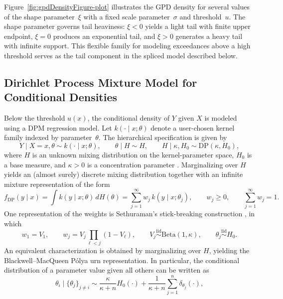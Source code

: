 \documentclass[article]{jss}\usepackage[]{graphicx}\usepackage[]{xcolor}
\begin{document}
Figure~\ref{fig:gpdDensityFigure-plot} illustrates the GPD density for
several values of the shape parameter~$\xi$ with a fixed scale
parameter~$\sigma$ and threshold~$u$.  The shape parameter governs
tail heaviness: $\xi < 0$ yields a light tail with finite upper
endpoint, $\xi = 0$ produces an exponential tail, and $\xi > 0$
generates a heavy tail with infinite support.  This flexible family for
modeling exceedances above a high threshold serves as the tail
component in the spliced model described below.


\subsection{Dirichlet Process Mixture Model for Conditional Densities}
\label{subsec:dpm}

Below the threshold $u(x)$, the conditional density of $Y$ given $X$
is modeled using a DPM regression model.  Let
$k(\cdot\mid x;\theta)$ denote a user-chosen kernel family indexed by
parameter~$\theta$.  The hierarchical specification is given by
\begin{equation}
Y \mid X=x,\theta \sim k(\cdot\mid x;\theta),
\qquad
\theta \mid H \sim H,
\qquad
H \mid \kappa,H_0 \sim \mathrm{DP}(\kappa,H_0),
\label{eq:dpm_hier}
\end{equation}
where $H$ is an unknown mixing distribution on the kernel-parameter
space, $H_0$ is a base measure, and $\kappa>0$ is a concentration
parameter \citep{Ferguson1973}.  Marginalizing over $H$ yields an
(almost surely) discrete mixing distribution together with an infinite
mixture representation of the form
\begin{equation}
f_{\mathrm{DP}}(y\mid x)
=
\int k(y\mid x;\theta)\,dH(\theta)
=
\sum_{j=1}^{\infty} w_j\,k(y\mid x;\theta_j),
\qquad
w_j\ge 0,
\qquad
\sum_{j=1}^{\infty} w_j=1.
\label{eq:dpm_mixture}
\end{equation}
One representation of the weights is Sethuraman's stick-breaking
construction \citep{Sethuraman1994}, in which
\begin{equation}
w_1=V_1,
\qquad
w_j=V_j\prod_{\ell<j}(1-V_\ell),
\qquad
V_j \stackrel{\mathrm{iid}}{\sim}\mathrm{Beta}(1,\kappa),
\qquad
\theta_j \stackrel{\mathrm{iid}}{\sim} H_0.
\label{eq:sb}
\end{equation}
An equivalent characterization is obtained by marginalizing over $H$,
yielding the Blackwell--MacQueen P\'olya urn representation.  In
particular, the conditional distribution of a parameter value given all
others can be written as
\begin{equation}
\theta_i \mid \{\theta_j\}_{j \neq i}
\sim
\frac{\kappa}{\kappa+n} H_0(\cdot)
+
\frac{1}{\kappa+n}\sum_{j=1}^{n}\delta_{\theta_j}(\cdot),
\label{eq:crp}
\end{equation}
\end{document}
